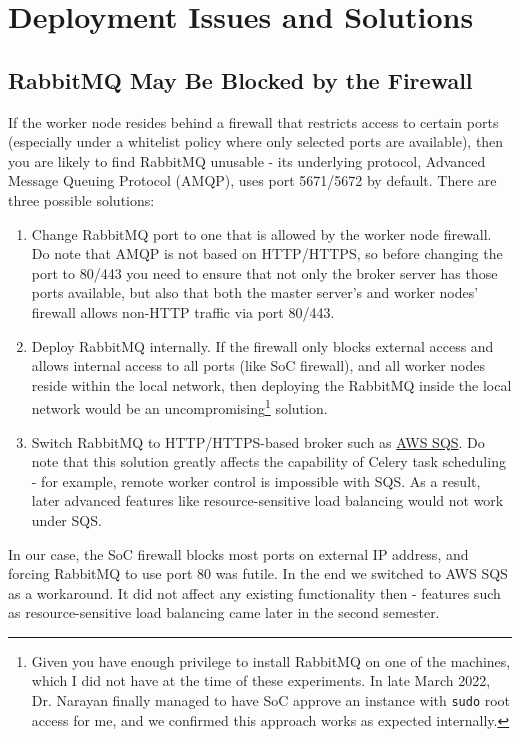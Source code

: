 \chapter{Deployment Issues and Solutions}
\label{appendix:deployment-issues}

\section{RabbitMQ May Be Blocked by the Firewall}
If the worker node resides behind a firewall that restricts access to certain ports (especially under a whitelist policy where only selected ports are available), then you are likely to find RabbitMQ unusable - its underlying protocol, Advanced Message Queuing Protocol (AMQP), uses port 5671/5672 by default. There are three possible solutions:
\begin{enumerate}
    \item Change RabbitMQ port to one that is allowed by the worker node firewall. Do note that AMQP is not based on HTTP/HTTPS, so before changing the port to 80/443 you need to ensure that not only the broker server has those ports available, but also that both the master server's and worker nodes' firewall allows non-HTTP traffic via port 80/443.
    \item Deploy RabbitMQ internally. If the firewall only blocks external access and allows internal access to all ports (like SoC firewall), and all worker nodes reside within the local network, then deploying the RabbitMQ inside the local network would be an uncompromising\footnote{Given you have enough privilege to install RabbitMQ on one of the machines, which I did not have at the time of these experiments. In late March 2022, Dr. Narayan finally managed to have SoC approve an instance with \texttt{sudo} root access for me, and we confirmed this approach works as expected internally.} solution.
    \item Switch RabbitMQ to HTTP/HTTPS-based broker such as \href{https://aws.amazon.com/sqs/}{AWS SQS}. Do note that this solution greatly affects the capability of Celery task scheduling - for example, remote worker control is impossible with SQS. As a result, later advanced features like resource-sensitive load balancing would not work under SQS.
\end{enumerate}
In our case, the SoC firewall blocks most ports on external IP address, and forcing RabbitMQ to use port 80 was futile. In the end we switched to AWS SQS as a workaround. It did not affect any existing functionality then - features such as resource-sensitive load balancing came later in the second semester.

